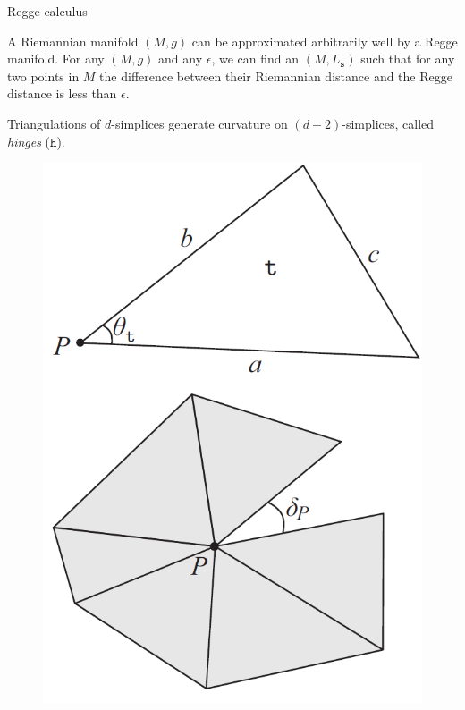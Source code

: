 \documentclass[12pt,titlepage]{article}
\begin{document}
\begin{frame}{Regge calculus}
    \begin{list}{\,}{\leftmargin=1em \itemindent=0em}
        \item A Riemannian manifold $(M,g)$ can be approximated arbitrarily well by a Regge manifold. For any $(M,g)$ and any $\epsilon$, we can find an $(M,L_\mathtt{s})$ such that for any two points in $M$ the difference between their Riemannian distance and the Regge distance is less than $\epsilon$.
        \item Triangulations of $d$-simplices generate curvature on $(d-2)$-simplices, called \textit{hinges} ($\mathtt{h}$).
        \item \noindent\FloatBarrier
        \begin{figure}[!ht]
            \begin{minipage}{0.3\linewidth}
                \includegraphics[width=\linewidth]{4.3}

\end{minipage}
\end{figure}
\end{list}
\end{frame}
\end{document}
